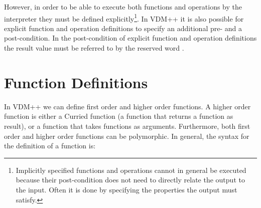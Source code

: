 \documentclass[\pformat,12pt]{article}
\newcommand{\vdmslpp}[2]{%
#2
}
\newcommand{\vdmpp}{VDM++}
\begin{document}
However, in order to be able to execute both functions and operations
by the interpreter they must be defined explicitly\footnote{Implicitly
specified functions and operations cannot in general be executed
because their post-condition does not need to directly relate the
output to the input. Often it is done by specifying the properties the
output must satisfy.}. In \vdmslpp{ VDM-SL}{\vdmpp} it is also
possible for explicit function and operation definitions to specify an
additional pre- and a post-condition.  In the post-condition of 
explicit function and operation definitions the result value must be
referred to by the reserved word .
 
\section{Function Definitions}\label{functiondef}

In \vdmslpp{ VDM-SL}{\vdmpp} we can define first order and higher order
functions. A higher order function is either a Curried function
(a function that returns a function as result), or a function that takes
functions as arguments. Furthermore, both first order and higher order
functions can be polymorphic. In general, the syntax for the definition of a
function is:






\end{document}
